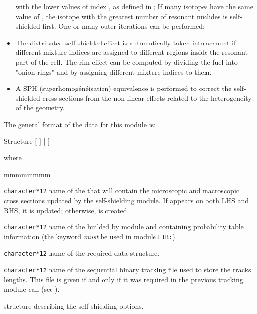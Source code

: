 \begin{itemize}
with the lower values of index , as defined in ; If
many isotopes have the same value of , the isotope with the greatest
number of resonant nuclides is self-shielded first. One or many outer iterations
can be performed;
\item The distributed self-shielded effect is automatically taken into account
if different mixture indices are assigned to different regions inside the
resonant part of the cell. The rim effect can be computed by dividing the fuel
into "onion rings" and by assigning different mixture indices to them. 
\item A SPH (superhomog\'en\'eisation) equivalence is performed to correct the
self-shielded cross sections from the non-linear effects related to the
heterogeneity of the geometry.
\end{itemize}

\vskip 0.2cm

The general format of the data for this module is:

\begin{DataStructure}{Structure }
 \moc{:=}   $[$  $]$
 $[$  $]$ \moc{::} 
\end{DataStructure}

\noindent
where

\begin{ListeDeDescription}{mmmmmmmm}

\item[\dusa{MICLIB}] {\tt character*12} name of the  that will
contain the microscopic and macroscopic cross sections updated by the
self-shielding module. If
 appears on both LHS and RHS, it is updated; otherwise,
 is created.

\item[\dusa{MICLIB\_SG}] {\tt character*12} name of the  builded
by module  and containing probability table information (the keyword  {\sl must} be
used in module {\tt LIB:}).

\item[\dusa{TRKNAM}] {\tt character*12} name of the required 
data structure.

\item[\dusa{TRKFIL}] {\tt character*12} name of the sequential binary tracking
file used to store the tracks lengths. This file is given if and only if it was
required in the previous tracking module call (see ).

\item[\dstr{descuss}] structure describing the self-shielding options.

\end{ListeDeDescription}


